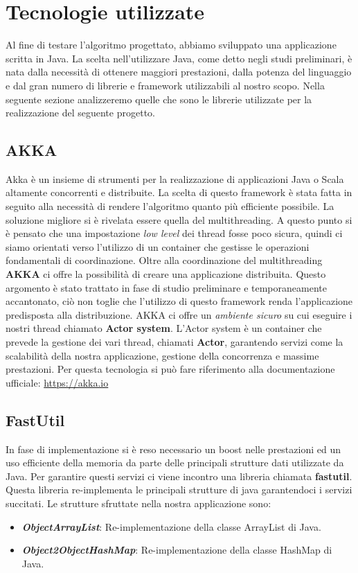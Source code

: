 \section{Tecnologie utilizzate}
Al fine di testare l'algoritmo progettato, abbiamo sviluppato una applicazione scritta in Java.
La scelta nell'utilizzare Java, come detto negli studi preliminari, è nata dalla necessità di ottenere maggiori prestazioni, dalla potenza del linguaggio e dal gran numero di librerie e framework utilizzabili al nostro scopo.
Nella seguente sezione analizzeremo quelle che sono le librerie utilizzate per la realizzazione del seguente progetto.
\subsection{AKKA}
Akka è un insieme di strumenti per la realizzazione di applicazioni Java o Scala altamente concorrenti e distribuite. 
La scelta di questo framework è stata fatta in seguito alla necessità di rendere l'algoritmo quanto più efficiente possibile. La soluzione migliore si è rivelata essere quella del multithreading. A questo punto si è pensato che una impostazione \emph{low level} dei thread fosse poco sicura, quindi ci siamo orientati verso l'utilizzo di un container che gestisse le operazioni fondamentali di coordinazione.
Oltre alla coordinazione del multithreading \textbf{AKKA} ci offre la possibilità di creare una applicazione distribuita.
Questo argomento è stato trattato in fase di studio preliminare e temporaneamente accantonato, ciò non toglie che l'utilizzo di questo framework renda l'applicazione predisposta alla distribuzione.
AKKA ci offre un \emph{ambiente sicuro} su cui eseguire i nostri thread chiamato \textbf{Actor system}.
L'Actor system è un container che prevede la gestione dei vari thread, chiamati \textbf{Actor}, garantendo servizi come la scalabilità della nostra applicazione, gestione della concorrenza e massime prestazioni.
Per questa tecnologia si può fare riferimento alla documentazione ufficiale: \url{https://akka.io}
\subsection{FastUtil}
In fase di implementazione si è reso necessario un boost nelle prestazioni ed un uso efficiente della memoria da parte delle principali strutture dati utilizzate da Java.
Per garantire questi servizi ci viene incontro una libreria chiamata \textbf{fastutil}.
Questa libreria re-implementa le principali strutture di java garantendoci i servizi succitati.
Le strutture sfruttate nella nostra applicazione sono:
\begin{itemize}
	\item \textbf{\emph{ObjectArrayList}}: Re-implementazione della classe ArrayList di Java.
	\item \textbf{\emph{Object2ObjectHashMap}}: Re-implementazione della classe HashMap di Java.
\end{itemize}
